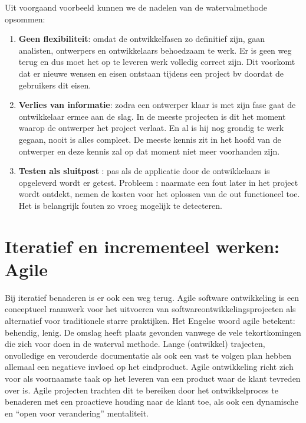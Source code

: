 Uit voorgaand voorbeeld kunnen we de nadelen van de watervalmethode opsommen:
\begin{enumerate}
	\item \textbf{Geen flexibiliteit}: omdat de ontwikkelfasen zo definitief zijn, gaan analisten, ontwerpers en ontwikkelaars behoedzaam te werk. Er is geen weg terug en dus moet het op te leveren werk volledig correct zijn. Dit voorkomt  dat er nieuwe wensen en eisen ontstaan tijdens een project bv doordat de gebruikers dit eisen. 
	\item \textbf{Verlies van informatie}: zodra een ontwerper klaar is met zijn fase gaat de ontwikkelaar ermee aan de slag. In de meeste projecten is dit het moment waarop de ontwerper het project verlaat. En al is hij nog grondig te werk gegaan, nooit is alles compleet. De meeste kennis zit in het hoofd van de ontwerper en deze kennis zal op dat moment niet meer voorhanden zijn.
	\item \textbf{Testen als sluitpost} : pas als de applicatie door de ontwikkelaars is opgeleverd wordt  er getest. Probleem : naarmate een fout later in het project wordt ontdekt, nemen de kosten voor het oplossen van de out functioneel toe. Het is belangrijk fouten zo vroeg mogelijk te detecteren. 
\end{enumerate}

\section{Iteratief en incrementeel werken: Agile}

Bij iteratief benaderen is er ook een weg terug. Agile software ontwikkeling is een conceptueel raamwerk voor het uitvoeren van softwareontwikkelingsprojecten als alternatief voor traditionele starre praktijken. Het Engelse woord agile betekent: behendig, lenig. De omslag heeft plaats gevonden vanwege de vele tekortkomingen die zich voor doen in de waterval methode. Lange (ontwikkel) trajecten, onvolledige en verouderde documentatie als ook een vast te volgen plan hebben allemaal een negatieve invloed op het eindproduct.
Agile ontwikkeling richt zich voor als voornaamste taak op het leveren van een product waar de klant tevreden over is. Agile projecten trachten dit te bereiken door het ontwikkelproces te benaderen met een proactieve houding naar de klant toe, als ook een dynamische en ``open voor verandering'' mentaliteit.

